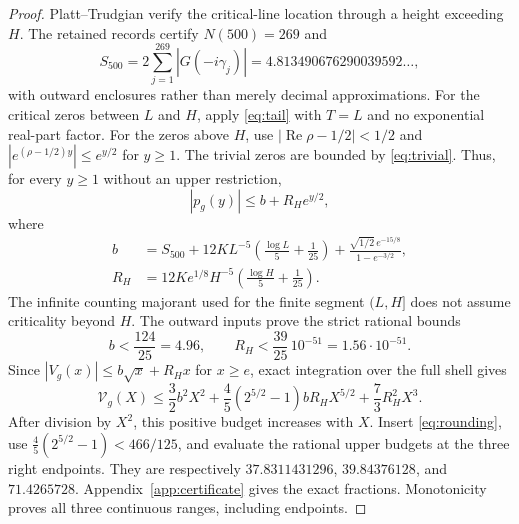 \documentclass[11pt]{article}
\theoremstyle{remark}
\newcommand{\Vcal}{\mathcal V_g}
\newcommand{\Rea}{\operatorname{Re}}
\numberwithin{equation}{section}
\begin{document}
\begin{proof}
Platt--Trudgian \cite[Theorem 1]{PT} verify the critical-line location
through a height exceeding $H$. The retained records certify
$N(500)=269$ and
\[
S_{500}=2\sum_{j=1}^{269}|G(-i\gamma_j)|
=4.813490676290039592\ldots,
\]
with outward enclosures rather than merely decimal approximations.
For the critical zeros between $L$ and $H$, apply \eqref{eq:tail}
with $T=L$ and no exponential real-part factor. For the zeros above
$H$, use $|\Rea\rho-1/2|<1/2$ and
$|e^{(\rho-1/2)y}|\le e^{y/2}$ for $y\ge1$.
The trivial zeros are bounded by \eqref{eq:trivial}. Thus, for every
$y\ge1$ without an upper restriction,
\begin{equation}\label{eq:envelope}
|p_g(y)|\le b+R_H e^{y/2},
\end{equation}
where
\begin{equation}\label{eq:b-r}
\begin{split}
b&=S_{500}+12K L^{-5}\left(\frac{\log L}{5}+\frac1{25}\right)
+\frac{\sqrt{1/2}\,e^{-15/8}}{1-e^{-3/2}},\\
R_H&=12Ke^{1/8}H^{-5}\left(\frac{\log H}{5}+\frac1{25}\right).
\end{split}
\end{equation}
The infinite counting majorant used for the finite segment $(L,H]$
does not assume criticality beyond $H$.
The outward inputs prove the strict rational bounds
\begin{equation}\label{eq:rounding}
b<\frac{124}{25}=4.96,\qquad
R_H<\frac{39}{25}\,10^{-51}=1.56\cdot10^{-51}.
\end{equation}
Since $|V_g(x)|\le b\sqrt{x}+R_Hx$ for $x\ge e$, exact integration
over the full shell gives
\begin{equation}\label{eq:budget}
\Vcal(X)\le\frac32b^2X^2+
\frac45(2^{5/2}-1)bR_HX^{5/2}+\frac73R_H^2X^3.
\end{equation}
After division by $X^2$, this positive budget increases with $X$.
Insert \eqref{eq:rounding}, use
$\frac45(2^{5/2}-1)<466/125$, and evaluate the rational upper budgets
at the three right endpoints. They are respectively
$37.8311431296$, $39.84376128$, and $71.4265728$.
Appendix~\ref{app:certificate} gives the exact fractions.
Monotonicity proves all three continuous ranges, including endpoints.
\end{proof}
\end{document}

